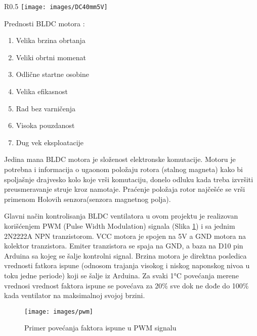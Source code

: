 \documentclass[a4paper, 12pt]{article}
\begin{document}
\begin{wrapfigure}{R}{0.5\textwidth}
\centering
\texttt{[image: images/DC40mm5V]} 
\caption{Ventilator} \label{fig:DC40mm5V}
\end{wrapfigure}

\vspace{10pt}

Prednosti BLDC motora : 

\begin{enumerate}
	\item Velika brzina obrtanja 
	\item Veliki obrtni momenat 
	\item Odlične startne osobine 
	\item Velika efikasnost 
	\item Rad bez varničenja  
	\item Visoka pouzdanost  
	\item Dug vek eksploatacije
\end{enumerate}

\endgroup
\pagebreak
Jedina mana BLDC motora je složenost elektronske komutacije. Motoru je potrebna i informacija o ugaonom položaju rotora (stalnog magneta) kako bi spoljašnje drajvesko kolo koje vrši komutaciju, donelo odluku kada treba izvršiti preusmeravanje struje kroz namotaje. Praćenje položaja rotor najčešće se vrši primenom Holovih senzora(senzora magnetnog polja).

\vspace{10pt}

Glavni način kontrolisanja BLDC ventilatora u ovom projektu je realizovan korišćenjem  PWM (Pulse Width Modulation) signala (Slika \ref{fig:pwm}) i sa jednim 2N2222A NPN tranzistorom. VCC motora je spojen na 5V a GND motora na kolektor tranzistora. Emiter tranzistora se spaja na GND, a baza na D10 pin Arduina sa kojeg se šalje kontrolni signal. Brzina motora je direktna posledica vrednosti fatkora ispune (odnosom trajanja visokog i niskog naponskog nivoa u toku jedne periode) koji se šalje iz Arduina. Za svaki 1°C povećanja merene vrednosi vrednost faktora ispune se povećava za 20\% sve dok ne dođe do 100\% kada ventilator na maksimalnoj svojoj brzini. 

\vspace{10pt}

\begin{figure}[H]
\centering
	\texttt{[image: images/pwm]}
	\caption{Primer povećanja faktora ispune u PWM signalu} \label{fig:pwm}
\end{figure}
\pagebreak
\end{document}
